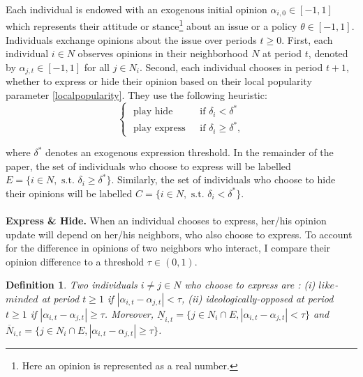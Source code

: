 \documentclass{article}
\newtheorem{definition}{Definition}
\begin{document}
Each individual is endowed with an exogenous initial opinion $\alpha_{i,0} \in [-1,1]$ which represents their attitude or stance\footnote{Here an opinion is represented as a real number.} about an issue or a policy $\theta \in [-1,1]$. Individuals exchange opinions about the issue over periods $t \geq 0$. First, each individual $i \in N$ observes opinions in their neighborhood $N$ at period $t$, denoted by ${\alpha}_{j,t} \in [-1,1]$ for all $j \in N_i$. Second, each individual chooses in period $t+1$, whether to express or hide their opinion based on their local popularity parameter \eqref{localpopularity}. They use the following heuristic: 
\begin{equation*}
\begin{cases}
 \text{ play hide } & \text{ if } \delta_i < \delta^{*}  \\
\text{ play express } & \text{ if } \delta_i \geq \delta^{*},
\end{cases}
\end{equation*} 
\bigskip

\noindent where $\delta^{*}$ denotes an exogenous expression threshold. In the remainder of the paper, the set of individuals who choose to express will be labelled $E=\{ i \in N, \text{ s.t. } \delta_i \geq \delta^{*} \}$. Similarly, the set of individuals who choose to hide their opinions will be labelled $C=\{ i \in N, \text{ s.t. } \delta_i < \delta^{*} \}$.   \\
\\ {\bf Express \& Hide.} When an individual chooses to express, her/his opinion update will depend on her/his neighbors, who also choose to express. To account for the difference in opinions of two neighbors who interact, I compare their opinion difference to a threshold $\tau \in (0,1)$.

\begin{definition} Two individuals $ i \neq j \in N$ who choose to express are : (i) $like$-$minded$ at period $t \geq 1$ if $|\alpha_{i,t} - \alpha_{j,t}| < \tau$, (ii) \textit{ideologically-opposed} at period $t \geq 1$ if $|\alpha_{i,t} - \alpha_{j,t}| \geq \tau$. Moreover, $\underline{N}_{i,t} =\{ j \in N_i \cap E, |\alpha_{i,t} - \alpha_{j,t}| < \tau\}$ and $\overline{N}_{i,t} =\{ j \in N_i \cap E, |\alpha_{i,t} - \alpha_{j,t}| \geq \tau\}$. 
\end{definition}
\end{document}
